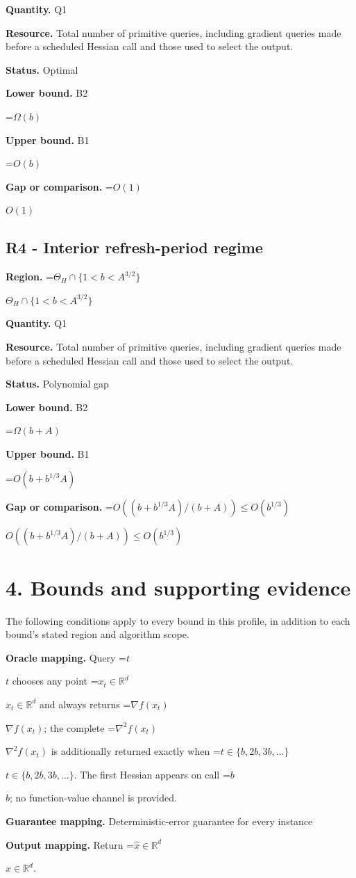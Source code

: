 \documentclass[10pt,a4paper]{article}
\newcommand{\AtlasMath}[1]{\par\begingroup\centering\setbox0=\hbox{$\displaystyle #1$}\ifdim\wd0>1.4\linewidth\typeout{ATLAS WIDE FORMULA: \the\wd0}\fi\ifdim\wd0>\linewidth\resizebox{\linewidth}{!}{\box0}\else\box0\fi\par\endgroup}
\newcommand{\AtlasInlineMath}[1]{\begingroup\setbox0=\hbox{$#1$}\ifdim\wd0>.4\linewidth\endgroup\AtlasMath{#1}\else\endgroup$#1$\fi}
\begin{document}
\textbf{Quantity.} Q1

\textbf{Resource.} Total number of primitive queries, including gradient queries made before a scheduled Hessian call and those used to select the output.

\textbf{Status.} Optimal

\textbf{Lower bound.} B2

\AtlasMath{\Omega(b)}
\textbf{Upper bound.} B1

\AtlasMath{O(b)}
\textbf{Gap or comparison.} \AtlasInlineMath{O(1)}

\subsection{R4 - Interior refresh-period regime}
\textbf{Region.} \AtlasInlineMath{\Theta_H\cap\{1<b<A^{3/2}\}}

\textbf{Quantity.} Q1

\textbf{Resource.} Total number of primitive queries, including gradient queries made before a scheduled Hessian call and those used to select the output.

\textbf{Status.} Polynomial gap

\textbf{Lower bound.} B2

\AtlasMath{\Omega(b+A)}
\textbf{Upper bound.} B1

\AtlasMath{O(b+b^{1/3}A)}
\textbf{Gap or comparison.} \AtlasInlineMath{O((b+b^{1/3}A)/(b+A))\le O(b^{1/3})}

\section{4. Bounds and supporting evidence}
The following conditions apply to every bound in this profile, in addition to each bound's stated region and algorithm scope.

\textbf{Oracle mapping.} Query \AtlasInlineMath{t} chooses any point \AtlasInlineMath{x_t\in\mathbb{R}^d} and always returns \AtlasInlineMath{\nabla f(x_t)}; the complete \AtlasInlineMath{\nabla^2f(x_t)} is additionally returned exactly when \AtlasInlineMath{t\in\{b,2b,3b,\ldots\}}. The first Hessian appears on call \AtlasInlineMath{b}; no function-value channel is provided.

\textbf{Guarantee mapping.} Deterministic-error guarantee for every instance

\textbf{Output mapping.} Return \AtlasInlineMath{\widehat{x}\in \mathbb{R}^d}.
\end{document}

